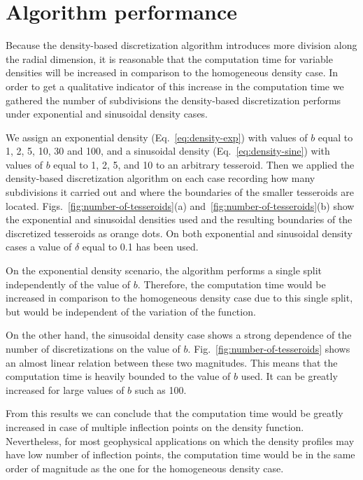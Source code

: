 \documentclass[extra, referee]{gji}
\begin{document}

\section{Algorithm performance}

Because the density-based discretization algorithm introduces more division along the
radial dimension, it is reasonable that the computation time for variable densities will
be increased in comparison to the homogeneous density case.
In order to get a qualitative indicator of this increase in the computation time we
gathered the number of subdivisions the density-based discretization performs under
exponential and sinusoidal density cases.

We assign an exponential density (Eq.~\ref{eq:density-exp}) with values of $b$ equal to
1, 2, 5, 10, 30 and 100, and a sinusoidal density (Eq.~\ref{eq:density-sine}) with
values of $b$ equal to 1, 2, 5, and 10 to an arbitrary tesseroid.
Then we applied the density-based discretization algorithm on each case recording how
many subdivisions it carried out and where the boundaries of the smaller tesseroids are
located.
Figs.~\ref{fig:number-of-tesseroids}(a) and~\ref{fig:number-of-tesseroids}(b) show the
exponential and sinusoidal densities used and the resulting boundaries of the
discretized tesseroids as orange dots.
On both exponential and sinusoidal density cases a value of $\delta$ equal to 0.1 has
been used.

On the exponential density scenario, the algorithm performs a single split independently
of the value of $b$.
Therefore, the computation time would be increased in comparison to the homogeneous
density case due to this single split, but would be independent of the variation of the
function.

On the other hand, the sinusoidal density case shows a strong dependence of the
number of discretizations on the value of $b$.
Fig.~\ref{fig:number-of-tesseroids} shows an almost linear relation between these two
magnitudes.
This means that the computation time is heavily bounded to the value of $b$ used.
It can be greatly increased for large values of $b$ such as 100.

From this results we can conclude that the computation time would be greatly increased
in case of multiple inflection points on the density function.
Nevertheless, for most geophysical applications on which the density profiles may have
low number of inflection points, the computation time would be in the same order of
magnitude as the one for the homogeneous density case.
\end{document}
